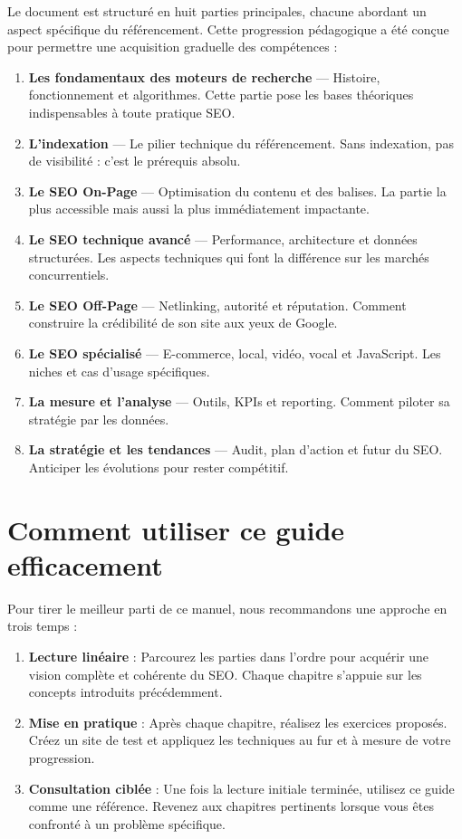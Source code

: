 \documentclass[12pt,a4paper,twoside]{report}
\begin{document}
Le document est structuré en huit parties principales, chacune abordant un aspect spécifique du référencement. Cette progression pédagogique a été conçue pour permettre une acquisition graduelle des compétences :

\begin{enumerate}
    \item \textbf{Les fondamentaux des moteurs de recherche} — Histoire, fonctionnement et algorithmes. Cette partie pose les bases théoriques indispensables à toute pratique SEO.
    \item \textbf{L'indexation} — Le pilier technique du référencement. Sans indexation, pas de visibilité : c'est le prérequis absolu.
    \item \textbf{Le SEO On-Page} — Optimisation du contenu et des balises. La partie la plus accessible mais aussi la plus immédiatement impactante.
    \item \textbf{Le SEO technique avancé} — Performance, architecture et données structurées. Les aspects techniques qui font la différence sur les marchés concurrentiels.
    \item \textbf{Le SEO Off-Page} — Netlinking, autorité et réputation. Comment construire la crédibilité de son site aux yeux de Google.
    \item \textbf{Le SEO spécialisé} — E-commerce, local, vidéo, vocal et JavaScript. Les niches et cas d'usage spécifiques.
    \item \textbf{La mesure et l'analyse} — Outils, KPIs et reporting. Comment piloter sa stratégie par les données.
    \item \textbf{La stratégie et les tendances} — Audit, plan d'action et futur du SEO. Anticiper les évolutions pour rester compétitif.
\end{enumerate}

\section*{Comment utiliser ce guide efficacement}

Pour tirer le meilleur parti de ce manuel, nous recommandons une approche en trois temps :

\begin{enumerate}
    \item \textbf{Lecture linéaire} : Parcourez les parties dans l'ordre pour acquérir une vision complète et cohérente du SEO. Chaque chapitre s'appuie sur les concepts introduits précédemment.
    \item \textbf{Mise en pratique} : Après chaque chapitre, réalisez les exercices proposés. Créez un site de test et appliquez les techniques au fur et à mesure de votre progression.
    \item \textbf{Consultation ciblée} : Une fois la lecture initiale terminée, utilisez ce guide comme une référence. Revenez aux chapitres pertinents lorsque vous êtes confronté à un problème spécifique.
\end{enumerate}
\end{document}
